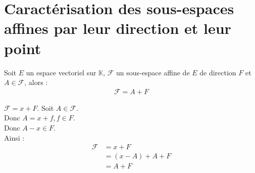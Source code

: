 \documentclass[../main.tex]{subfiles}
\begin{document}
\section{Caractérisation des sous-espaces affines par leur direction et leur point}
\begin{tcolorbox}[title=Théorème 23.8, title filled=false, colframe=orange, colback=orange!10!white]
    Soit $E$ un espace vectoriel sur $\mathbb{K}$, $\mathcal{F}$ un sous-espace affine de $E$ de direction $F$ et $A\in \mathcal{F}$, alors : 
    \begin{align*}
        \mathcal{F} = A + F
    \end{align*}
\end{tcolorbox}

\noindent $\mathcal{F} = x + F$. Soit $A \in \mathcal{F}$. \\
Donc $A = x + f, f \in F$. \\
Donc $A - x \in F$. \\
Ainsi : 
\begin{align*}
    \mathcal{F} &= x + F \\
    &= (x-A) + A + F \\
    &= A + F
\end{align*}
\end{document}
